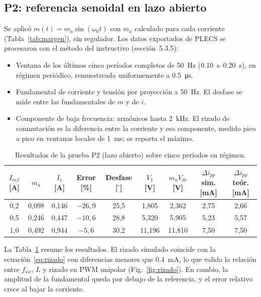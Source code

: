 \documentclass[10pt,twocolumn,letterpaper]{article}
\begin{document}
\subsection{P2: referencia senoidal en lazo abierto}
Se aplicó $m(t)=m_a\sin(\omega_0 t)$ con $m_a$ calculado para cada corriente (Tabla~\ref{tab:margen}), sin regulador. Los datos exportados de PLECS se procesaron con el método del instructivo (sección~5.3.5):
\begin{itemize}\setlength\itemsep{1pt}
\item Ventana de los últimos cinco períodos completos de \SI{50}{\hertz} (\SIrange{0,10}{0,20}{\second}), en régimen periódico, remuestreada uniformemente a \SI{0,5}{\micro\second}.
\item Fundamental de corriente y tensión por proyección a \SI{50}{\hertz}. El desfase se mide entre las fundamentales de $m$ y de $i$.
\item Componente de baja frecuencia: armónicos hasta \SI{2}{\kilo\hertz}. El rizado de conmutación es la diferencia entre la corriente y esa componente, medido pico a pico en ventanas locales de \SI{1}{\milli\second}; se reporta el máximo.
\end{itemize}

\begin{table}[!t]
\centering
\caption{Resultados de la prueba P2 (lazo abierto) sobre cinco períodos en régimen.}
\label{tab:p2}
\small
\begin{tabular}{@{}ccccccccc@{}}
\toprule
$I_{ref}$ [A] & $m_a$ & $I_1$ [A] & Error [\%] & Desfase [$^\circ$] & $V_1$ [V] & $m_aV_{dc}$ [V] & $\Delta i_{pp}$ sim. [mA] & $\Delta i_{pp}$ teór. [mA] \\
\midrule
0,2 & 0,098 & 0,146 & $-26{,}9$ & 25,5 & 1,805 & 2,362 & 2,75 & 2,66 \\
0,5 & 0,246 & 0,447 & $-10{,}6$ & 28,8 & 5,320 & 5,905 & 5,23 & 5,57 \\
1,0 & 0,492 & 0,944 & $-5{,}6$ & 30,2 & 11,196 & 11,810 & 7,50 & 7,50 \\
\bottomrule
\end{tabular}
\end{table}

La Tabla~\ref{tab:p2} resume los resultados. El rizado simulado coincide con la ecuación~\eqref{eq:rizado} con diferencias menores que \SI{0,4}{\milli\ampere}, lo que valida la relación entre $f_{sw}$, $L$ y rizado en PWM unipolar (Fig.~\ref{fig:rizado}). En cambio, la amplitud de la fundamental queda por debajo de la referencia, y el error relativo crece al bajar la corriente.
\end{document}
